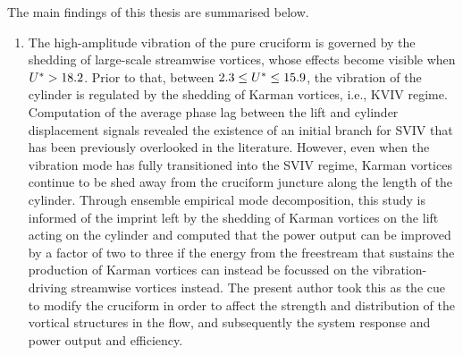 \documentclass[oneside]{utmthesis}
\begin{document}
\noindent The main findings of this thesis are summarised below.

\begin{enumerate}
  \item The high-amplitude vibration of the pure cruciform is governed by the shedding of large-scale streamwise vortices, whose effects become visible when $U^{*} > 18.2$. Prior to that, between $2.3 \leq U^{*} \leq 15.9$, the vibration of the cylinder is regulated by the shedding of Karman vortices, i.e., KVIV regime. Computation of the average phase lag between the lift and cylinder displacement signals revealed the existence of an initial branch for SVIV that has been previously overlooked in the literature. However, even when the vibration mode has fully transitioned into the SVIV regime, Karman vortices continue to be shed away from the cruciform juncture along the length of the cylinder. Through ensemble empirical mode decomposition, this study is informed of the imprint left by the shedding of Karman vortices on the lift acting on the cylinder and computed that the power output can be improved by a factor of two to three if the energy from the freestream that sustains the production of Karman vortices can instead be focussed on the vibration-driving streamwise vortices instead. The present author took this as the cue to modify the cruciform in order to affect the strength and distribution of the vortical structures in the flow, and subsequently the system response and power output and efficiency.


\end{enumerate}
\end{document}

